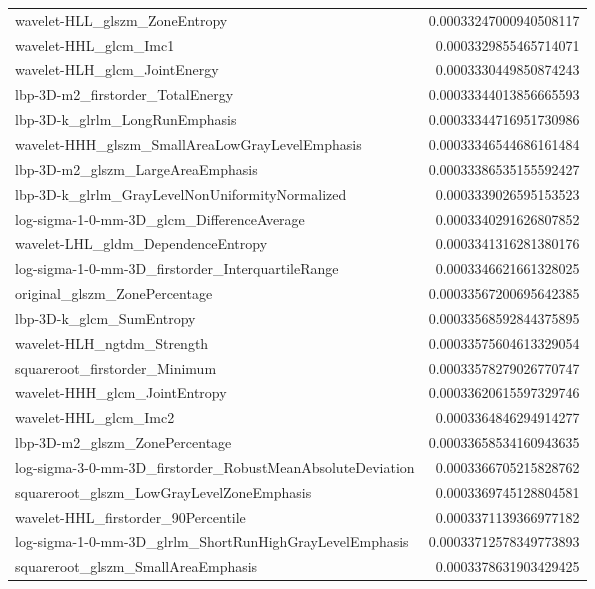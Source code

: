 {\begin{xltabular}[H]{\textwidth}{X r}
        wavelet-HLL\_glszm\_ZoneEntropy & 0.00033247000940508117 \\
        wavelet-HHL\_glcm\_Imc1 & 0.0003329855465714071 \\
        wavelet-HLH\_glcm\_JointEnergy & 0.0003330449850874243 \\
        lbp-3D-m2\_firstorder\_TotalEnergy & 0.00033344013856665593 \\
        lbp-3D-k\_glrlm\_LongRunEmphasis & 0.00033344716951730986 \\
        wavelet-HHH\_glszm\_SmallAreaLowGrayLevelEmphasis & 0.00033346544686161484 \\
        lbp-3D-m2\_glszm\_LargeAreaEmphasis & 0.00033386535155592427 \\
        lbp-3D-k\_glrlm\_GrayLevelNonUniformityNormalized & 0.0003339026595153523 \\
        log-sigma-1-0-mm-3D\_glcm\_DifferenceAverage & 0.0003340291626807852 \\
        wavelet-LHL\_gldm\_DependenceEntropy & 0.0003341316281380176 \\
        log-sigma-1-0-mm-3D\_firstorder\_InterquartileRange & 0.0003346621661328025 \\
        original\_glszm\_ZonePercentage & 0.00033567200695642385 \\
        lbp-3D-k\_glcm\_SumEntropy & 0.00033568592844375895 \\
        wavelet-HLH\_ngtdm\_Strength & 0.00033575604613329054 \\
        squareroot\_firstorder\_Minimum & 0.00033578279026770747 \\
        wavelet-HHH\_glcm\_JointEntropy & 0.00033620615597329746 \\
        wavelet-HHL\_glcm\_Imc2 & 0.0003364846294914277 \\
        lbp-3D-m2\_glszm\_ZonePercentage & 0.00033658534160943635 \\
        log-sigma-3-0-mm-3D\_firstorder\_RobustMeanAbsoluteDeviation & 0.0003366705215828762 \\
        squareroot\_glszm\_LowGrayLevelZoneEmphasis & 0.0003369745128804581 \\
        wavelet-HHL\_firstorder\_90Percentile & 0.0003371139366977182 \\
        log-sigma-1-0-mm-3D\_glrlm\_ShortRunHighGrayLevelEmphasis & 0.00033712578349773893 \\
        squareroot\_glszm\_SmallAreaEmphasis & 0.0003378631903429425 \\

\end{xltabular}}
